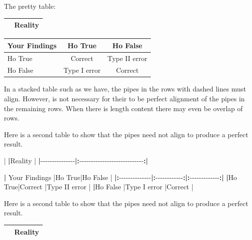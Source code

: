\documentclass[
]{book}
\newenvironment{Shaded}{\begin{snugshade}}{\end{snugshade}}
\newcommand{\ErrorTok}[1]{\textcolor[rgb]{0.64,0.00,0.00}{\textbf{#1}}}
\newcommand{\NormalTok}[1]{#1}
\newcommand{\SpecialCharTok}[1]{\textcolor[rgb]{0.00,0.00,0.00}{#1}}
\begin{document}
The pretty table:

\begin{longtable}[]{@{}lc@{}}
\toprule
& Reality \\
\midrule
\endhead
\bottomrule
\end{longtable}

\begin{longtable}[]{@{}lcc@{}}
\toprule
Your Findings & Ho True & Ho False \\
\midrule
\endhead
Ho True & Correct & Type II error \\
Ho False & Type I error & Correct \\
\bottomrule
\end{longtable}

In a stacked table such as we have, the pipes in the rows with dashed lines must align. However, is not necessary for their to be perfect alignment of the pipes in the remaining rows. When there is length content there may even be overlap of rows.

\begin{Shaded}
\begin{Highlighting}[]
\NormalTok{Here is a second table to show that the pipes need not align to produce a perfect result.}

\SpecialCharTok{|}   \ErrorTok{|}\NormalTok{Reality }\SpecialCharTok{|}
\ErrorTok{|}\SpecialCharTok{{-}{-}{-}{-}{-}{-}{-}{-}{-}{-}{-}{-}{-}{-}{-}}\ErrorTok{|:}\SpecialCharTok{{-}{-}{-}{-}{-}{-}{-}{-}{-}{-}{-}{-}{-}{-}{-}{-}{-}{-}{-}{-}{-}{-}{-}{-}{-}{-}{-}{-}}\ErrorTok{:|}

\ErrorTok{|}\NormalTok{ Your Findings }\SpecialCharTok{|}\NormalTok{Ho True}\SpecialCharTok{|}\NormalTok{Ho False }\SpecialCharTok{|}
\ErrorTok{|:}\SpecialCharTok{{-}{-}{-}{-}{-}{-}{-}{-}{-}{-}{-}{-}{-}{-}}\ErrorTok{|:}\SpecialCharTok{{-}{-}{-}{-}{-}{-}{-}{-}{-}{-}{-}{-}}\ErrorTok{:|:}\SpecialCharTok{{-}{-}{-}{-}{-}{-}{-}{-}{-}{-}{-}{-}{-}}\ErrorTok{:|}
\ErrorTok{|}\NormalTok{Ho True}\SpecialCharTok{|}\NormalTok{Correct }\SpecialCharTok{|}\NormalTok{Type II error }\SpecialCharTok{|}
\ErrorTok{|}\NormalTok{Ho False }\SpecialCharTok{|}\NormalTok{Type I error }\SpecialCharTok{|}\NormalTok{Correct }\SpecialCharTok{|}
\end{Highlighting}
\end{Shaded}

Here is a second table to show that the pipes need not align to produce a perfect result.

\begin{longtable}[]{@{}lc@{}}
\toprule
& Reality \\
\midrule
\endhead
\bottomrule
\end{longtable}
\end{document}
